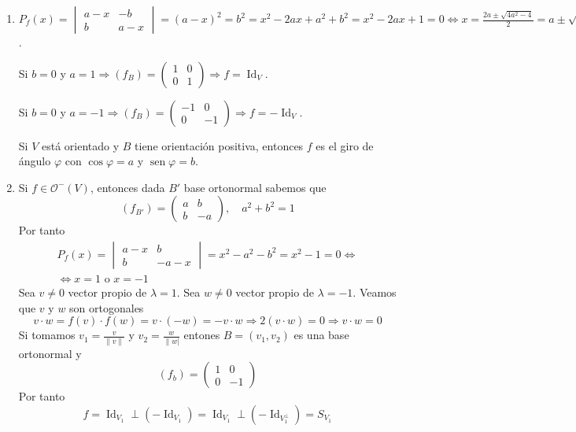 \documentclass[12pt, a4paper, ones, notitlepage, openany,titlepage]{article}
\begin{document}
\begin{enumerate}[label=(\arabic*)]
	\item $\displaystyle P_f(x) = \begin{vmatrix}
		a - x & - b \\
		b & a - x
	\end{vmatrix} = (a - x)^2 = b^2 = x^2 - 2ax + a^2 + b^2 = x^2 - 2ax + 1 = 0 \Longleftrightarrow x = \frac{2a \pm \sqrt{4a^2 - 4}}{2} = a \pm \sqrt{a^2 - 1} = a \pm \sqrt{-b^2} = a \pm bi$.
	
	Si $b = 0$ y $a = 1 \Longrightarrow (f_B) = \begin{pmatrix}
		1 & 0 \\
		0 & 1
	\end{pmatrix} \Longrightarrow f = \operatorname{Id}_V$.
	
	Si $b = 0$ y $a = -1 \Longrightarrow (f_B) = \begin{pmatrix}
		-1 & 0 \\
		0 & -1
	\end{pmatrix} \Longrightarrow f = -\operatorname{Id}_V$.
	
	Si $V$ está orientado y $B$ tiene orientación positiva, entonces $f$ es el giro de ángulo $\varphi$ con $\operatorname{cos}\varphi = a$ y $\operatorname{sen}\varphi = b$.
	
	\item Si $f \in \mathcal{O}^-(V)$, entonces dada $B'$ base ortonormal sabemos que
	$$
	(f_{B'}) = \begin{pmatrix}
		a & b \\
		b & -a
	\end{pmatrix}, \quad a^2 + b^2 = 1
	$$
	Por tanto
	\begin{gather*}
		P_f(x) = \begin{vmatrix}
			a - x & b \\
			b & - a - x
		\end{vmatrix} = x^2 - a^2 - b^2 = x^2 - 1 = 0 \Longleftrightarrow \\
		\Longleftrightarrow x = 1 \text{ o } x = -1
	\end{gather*}
	Sea $v \neq 0$ vector propio de $\lambda = 1$.
	Sea $w \neq 0$ vector propio de $\lambda = -1$.
	Veamos que $v$ y $w$ son ortogonales
	$$
	v \cdot w = f(v) \cdot f(w) = v \cdot (-w) = - v \cdot w \Longrightarrow 2(v \cdot w) = 0 \Longrightarrow v \cdot w = 0
	$$
	Si tomamos $v_1 = \frac{v}{\|v\|}$ y $v_2 = \frac{w}{\|w|}$ entones $B = (v_1, v_2)$ es una base ortonormal y
	$$
	(f_b) = \begin{pmatrix}
		1 & 0 \\
		0 & -1
	\end{pmatrix}
	$$
	Por tanto
	$$
	f = \operatorname{Id}_{V_1} \perp (-\operatorname{Id}_{V_1}) = \operatorname{Id}_{V_1} \perp (-\operatorname{Id}_{V_1^\perp}) = S_{V_1}
	$$
\end{enumerate}
\end{document}
